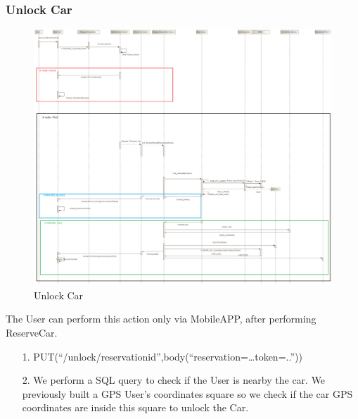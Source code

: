 \documentclass[12pt]{article}
\begin{document}
\subsubsection{Unlock Car}
\begin{figure}[h]
	\centering
	\includegraphics[width=\textwidth]{../Images/Sequence_Final/Unlock_Car}
	\caption{Unlock Car}
\end{figure}
The User can perform this action only via MobileAPP, after performing ReserveCar.
\begin{enumerate}
	\item[1.] PUT(“/unlock/{reservationid}”,body(“reservation=…token=..”))
	\item[2.] We perform a SQL query to check if the User is nearby the car. We previously built a GPS User’s coordinates square so we check if the car GPS coordinates are inside this square to unlock the Car.
\end{enumerate}
\clearpage
\end{document}
